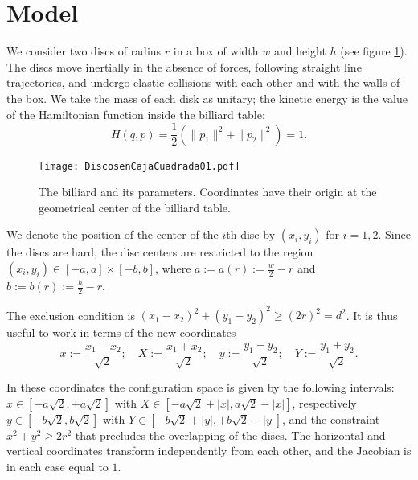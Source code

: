 \documentclass[letterpaper,10pt, jcp, aps]{revtex4-1}
\newcommand{\defeq}{:=}
\begin{document}
\section{Model}


We consider two discs of radius $r$  %
in a box of width $w$ and height $h$ (see figure \ref{billar01}). 
The discs move inertially in the absence of forces, 
following straight line trajectories,
and undergo elastic collisions with each 
other and with the walls of the box.
We take the mass of each disk as unitary; the kinetic energy
is the value of the Hamiltonian function inside the billiard table:
\begin{equation}
H(q,p)=\frac{1}{2}(\|p_1\|^2+\|p_2\|^2)=1.
\end{equation}

\begin{figure}[h]
  \begin{center}
  \texttt{[image: DiscosenCajaCuadrada01.pdf]}
  \end{center}
  \caption{The billiard and its parameters. Coordinates
    have their origin at the geometrical center of the 
    billiard table.}\label{billar01}
\end{figure}

We denote the position of the center of the $i$th disc by 
$(x_{i}, y_{i})$ for $i=1,2$. Since the discs are hard, 
the disc centers are restricted to the region 
$(x_i, y_i) \in [-a,a] \times [-b, b]$, where 
$a \defeq a(r) \defeq \frac{w}{2} - r $ and
$b \defeq b(r) \defeq \frac{h}{2} - r $.


The exclusion condition is $(x_1-x_2)^2 + (y_1-y_2)^2 \ge (2r)^2 = d^2$.
It is thus useful to work in terms of the new coordinates
\begin{equation}\label{cambiocoor01}
 x \defeq \frac{x_1 - x_2}{\sqrt{2}}; 
\quad X \defeq \frac{x_1 + x_2}{\sqrt{2}}; 
\quad y \defeq \frac{y_1 - y_2}{\sqrt{2}}; 
\quad Y \defeq \frac{y_1 + y_2}{\sqrt{2}}.
\end{equation}

In these coordinates the configuration space is given by the following
intervals:
$x \in [-a \sqrt{2}, +a \sqrt{2}]$ with 
$X \in [-a \sqrt{2} + |x|, a \sqrt{2} - |x|]$, respectively 
 $y \in [-b \sqrt{2}, b \sqrt{2}]$ with $Y \in [-b \sqrt{2} + |y|, +b \sqrt{2} - |y|]$,  
and the constraint $x^2 + y^2 \ge 2 r^2$ that precludes the overlapping of
the discs.
The horizontal and vertical coordinates transform independently
from each other, and the Jacobian is in each case equal to $1$.
\end{document}
